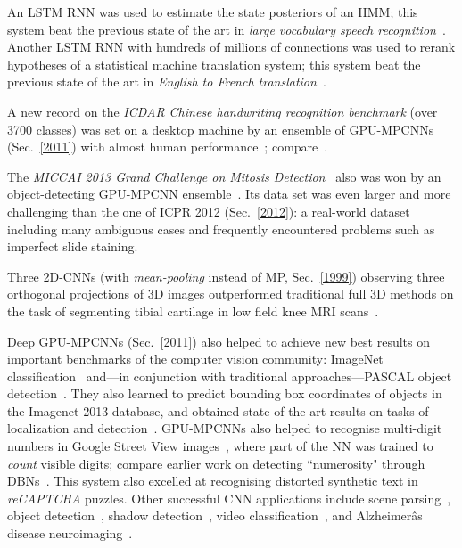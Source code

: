 \documentclass[letterpaper]{article}
\begin{document}
\begin{CJK*}{UTF8}{gbsn}
An LSTM RNN was used to estimate the state posteriors of an HMM; this system
 beat the previous state of the art in {\em large vocabulary speech recognition}~\citep{sak2014,sak2014large}. 
Another LSTM RNN with hundreds of millions of connections was used to rerank hypotheses of a statistical machine translation system; this system
beat the previous state of the art in {\em English to French translation}~\citep{sutskever2014}.

A new record on the {\em ICDAR Chinese handwriting recognition 
benchmark} (over 3700 classes) was set on a desktop machine
by an ensemble of GPU-MPCNNs (Sec.~\ref{2011}) with almost human performance~\citep{chinese2013};
compare~\citep{icdar2013}.

The {\em MICCAI 2013 Grand Challenge on Mitosis Detection}~\citep{miccai13}
also was won by an object-detecting  GPU-MPCNN ensemble~\citep{miccai2013}.
Its data set was even larger and more challenging than the one of ICPR 2012 (Sec.~\ref{2012}): a real-world dataset including many ambiguous cases and frequently encountered problems such as imperfect slide staining. 

Three 2D-CNNs (with {\em mean-pooling} instead of MP, Sec.~\ref{1999}) observing three orthogonal projections of 3D images
outperformed traditional full 3D methods on the task of segmenting tibial
cartilage in low field knee MRI scans~\citep{prasoon:13}.
 


Deep GPU-MPCNNs (Sec.~\ref{2011}) also helped to achieve new best results
on important benchmarks of the computer vision community:
ImageNet classification~\citep{zeiler2013,szegedy2014} 
and---in 
conjunction with traditional 
approaches---PASCAL object detection~\citep{malik2013}.
They also learned to predict bounding box coordinates  of
 objects in the Imagenet 2013 database,
and obtained state-of-the-art results on tasks of localization and 
detection~\citep{sermanet2013}.
GPU-MPCNNs also helped to recognise
multi-digit numbers  in Google Street View images~\citep{goodfellow2014multi},
where part of the NN was trained to {\em count} visible digits;
compare earlier work on detecting ``numerosity" through DBNs~\citep{stoianov2012}.
This system also excelled at recognising distorted synthetic text in {\em reCAPTCHA} puzzles.
Other successful CNN applications include 
scene parsing~\citep{Farabet2013}, object detection~\citep{Szegedy2013},
shadow detection~\citep{khan2014},
video classification~\citep{karpathy2014},
and Alzheimerâs disease neuroimaging~\citep{shuiwang2014}.





\end{CJK*}
\end{document}

